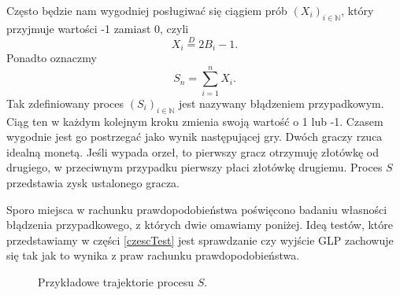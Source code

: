 \documentclass[a4paper,11pt,oneside]{book}
\begin{document}
Często będzie nam wygodniej posługiwać się ciągiem prób $(X_i)_{i \in \mathbb{N}}$, który przyjmuje wartości -1 zamiast 0, czyli
\[ X_i \stackrel{D}{=} 2 B_i -1. \]
Ponadto oznaczmy
\[ S_n = \sum_{i=1}^{n} X_i. \]
Tak zdefiniowany proces $(S_i)_{i \in \mathbb{N}}$ jest nazywany błądzeniem przypadkowym. Ciąg ten w każdym kolejnym kroku zmienia swoją wartość o 1 lub -1. Czasem wygodnie jest go postrzegać jako wynik następującej gry. Dwóch graczy rzuca idealną monetą. Jeśli wypada orzeł, to pierwszy gracz otrzymuję złotówkę od drugiego, w przeciwnym przypadku pierwszy płaci złotówkę drugiemu. Proces $S$ przedstawia zysk ustalonego gracza.

Sporo miejsca w rachunku prawdopodobieństwa poświęcono badaniu własności błądzenia przypadkowego, z których dwie omawiamy poniżej. Ideą testów, które przedstawiamy w części \ref{czescTest} jest sprawdzanie czy wyjście GLP zachowuje się tak jak to wynika z praw rachunku prawdopodobieństwa.

\begin{figure}
 \caption{Przykładowe trajektorie procesu $S$.}
 \label{fig:bladzenie}
\end{figure}
\end{document}
